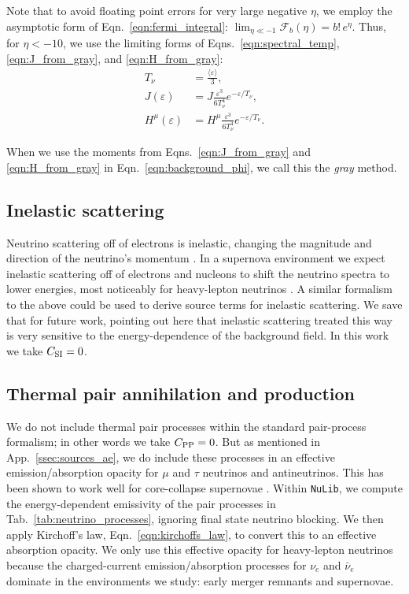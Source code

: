 \documentclass[aps,floatfix,prd,superscriptaddress,twocolumn]{revtex4-1}
\begin{document}
Note that to avoid floating point errors for very large negative $\eta$,
we employ the asymptotic form of Eqn.~\ref{eqn:fermi_integral}:
$\lim_{\eta\ll-1}\mathscr{F}_b(\eta) = b!\,e^\eta$.
Thus, for $\eta<-10$, we use the limiting forms of
Eqns.~\ref{eqn:spectral_temp},
\ref{eqn:J_from_gray},
and \ref{eqn:H_from_gray}:
\begin{align}
    T_\nu &= 
    \frac{\langle \varepsilon \rangle}{3}, \\
    J(\varepsilon) &=
    J \frac{\varepsilon^3}{6 T_\nu^4} e^{-\varepsilon/T_\nu}, \\
    H^\mu(\varepsilon) &=
    H^\mu \frac{\varepsilon^3}{6 T_\nu^4} e^{-\varepsilon/T_\nu}.
\end{align}

When we use the moments from Eqns.~\ref{eqn:J_from_gray} and
\ref{eqn:H_from_gray} in Eqn.~\ref{eqn:background_phi},
we call this the \emph{gray} method.

\subsection{Inelastic scattering}
\label{ssec:sources_si}
Neutrino scattering off of electrons is inelastic, changing the
magnitude and direction of the neutrino's momentum \cite{brue1985-core_collapse}.
In a supernova environment we expect inelastic scattering off of electrons
and nucleons to shift the neutrino spectra to lower energies, most noticeably
for heavy-lepton neutrinos \cite{thom2003-ccsne_neutrinos}.
A similar formalism to the above could be used to derive source terms
for inelastic scattering.
We save that for future work, pointing out here that inelastic scattering
treated this way is very sensitive to the energy-dependence of
the background field. In this work we take $C_{\rm SI}=0$.

\subsection{Thermal pair annihilation and production}
\label{ssec:sources_pp}
We do not include thermal pair processes within the standard pair-process
formalism; in other words we take $C_{\rm PP}=0$.
But as mentioned in App.~\ref{ssec:sources_ae}, we do include
these processes in an effective emission/absorption opacity for $\mu$
and $\tau$ neutrinos and antineutrinos.
This has been shown to work well for core-collapse supernovae
\cite{ocon2015-gr1d_with_nu}. Within \lstinline{NuLib}, we compute
the energy-dependent emissivity of the pair processes in
Tab.~\ref{tab:neutrino_processes}, ignoring final state neutrino blocking.
We then apply Kirchoff's law, Eqn.~\ref{eqn:kirchoffs_law},
to convert this to an effective absorption opacity.
We only use this effective opacity for heavy-lepton neutrinos
because the charged-current emission/absorption processes for $\nu_e$
and $\bar{\nu}_e$ dominate in the environments we study: early merger
remnants and supernovae.


\end{document}
